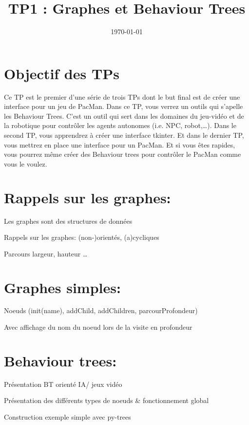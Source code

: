 \documentclass{article}
\date{\today}
\title{TP1 : Graphes et Behaviour Trees}
\begin{document}
\maketitle

\section{Objectif des TPs}
\label{sec-1}
Ce TP est le premier d'une série de trois TPs dont le but final est de créer une interface pour un jeu de PacMan.
Dans ce TP, vous verrez un outils qui s'apelle les Behaviour Trees.
C'est un outil qui sert dans les domaines du jeu-vidéo et de la robotique pour contrôler les agents autonomes (i.e. NPC, robot,\ldots{}).
Dans le second TP, vous apprendrez à créer une interface tkinter.
Et dans le dernier TP, vous mettrez en place une interface pour un PacMan.
Et si vous êtes rapides, vous pourrez même créer des Behaviour trees pour contrôler le PacMan comme vous le voulez.

\section{Rappels sur les graphes:}
\label{sec-2}
Les graphes sont des structures de données

Rappels sur les graphes: (non-)orientés, (a)cycliques

Parcours largeur, hauteur \ldots{}


\section{Graphes simples:}
\label{sec-3}
Noeuds (init(name), addChild, addChildren,  parcourProfondeur)

Avec affichage du nom du noeud lors de la visite en profondeur

\section{Behaviour trees:}
\label{sec-4}
Présentation BT orienté IA/ jeux vidéo

Présentation des différents types de noeuds \& fonctionnement global

Construction exemple simple avec py-trees
\end{document}
